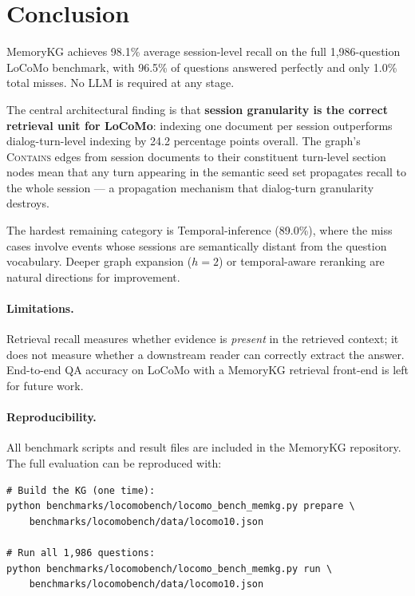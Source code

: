\documentclass[11pt,a4paper]{article}
\begin{document}
\section{Conclusion}
\label{sec:conclusion}

MemoryKG achieves 98.1\% average session-level recall on the full 1,986-question
LoCoMo benchmark, with 96.5\% of questions answered perfectly and only 1.0\%
total misses.
No LLM is required at any stage.

The central architectural finding is that \textbf{session granularity is the
correct retrieval unit for LoCoMo}: indexing one document per session
outperforms dialog-turn-level indexing by 24.2 percentage points overall.
The graph's \textsc{Contains} edges from session documents to their constituent
turn-level section nodes mean that any turn appearing in the semantic seed
set propagates recall to the whole session --- a propagation mechanism that
dialog-turn granularity destroys.

The hardest remaining category is Temporal-inference (89.0\%), where the miss
cases involve events whose sessions are semantically distant from the question
vocabulary.
Deeper graph expansion ($h{=}2$) or temporal-aware reranking are natural
directions for improvement.

\paragraph{Limitations.}
Retrieval recall measures whether evidence is \emph{present} in the retrieved
context; it does not measure whether a downstream reader can correctly extract
the answer.
End-to-end QA accuracy on LoCoMo with a MemoryKG retrieval front-end is left
for future work.

\paragraph{Reproducibility.}
All benchmark scripts and result files are included in the MemoryKG repository.
The full evaluation can be reproduced with:
\begin{lstlisting}
# Build the KG (one time):
python benchmarks/locomobench/locomo_bench_memkg.py prepare \
    benchmarks/locomobench/data/locomo10.json

# Run all 1,986 questions:
python benchmarks/locomobench/locomo_bench_memkg.py run \
    benchmarks/locomobench/data/locomo10.json
\end{lstlisting}
\end{document}
